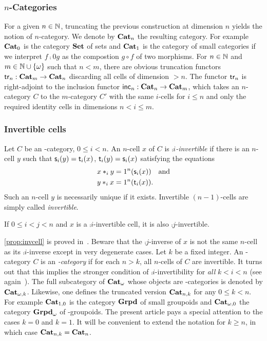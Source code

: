 \subsubsection{$n$-Categories}\label{ssubsec:ncat}
For a given $n\in\mathbb N$, truncating the previous construction at dimension $n$ yields the notion of $n$-category.  We denote by $\mathbf{Cat}_{n}$ the resulting category. For example $\mathbf{Cat}_{0}$ is the category $\mathbf{Set}$ of sets and $\mathbf{Cat}_{1}$ is the category of small categories if we interpret $f\comp 0 g$ as the compostion $g\circ f$ of two morphisms.
For $n\in\mathbb N$ and $m\in\mathbb N\cup \left\{\omega\right\}$ such that $n<m$, there are 
obvious truncation functors $\mathsf{tr}_{n}:\mathbf{Cat}_{m}\to \mathbf{Cat}_{n}$ discarding all cells of dimension $>n$. The functor $\mathsf{tr}_{n}$ is right-adjoint to the inclusion functor  $\mathsf{inc}_{n}:\mathbf{Cat}_{n}\to\mathbf{Cat}_{m}$, which takes an $n$-category $C$ to the $m$-category $C'$ with the same $i$-cells for $i\leq n$ and only the required identity cells in dimensions $n<i\leq m$.

\subsubsection{Invertible cells}\label{ssubsec:invert}
Let $C$ be an \oo-category, $0\leq i <n$. An $n$-cell $x$ of $C$ is {\em $\comp i$-invertible} if there is an $n$-cell $y$ such that $\mathsf{s}_{i}(y)=\mathsf{t}_{i}(x)$, $\mathsf{t}_{i}(y)=\mathsf{s}_{i}(x)$ satisfying the equations 
  \begin{align*}
    x\ast_{i} y & = 1^{n}(\mathsf{s}_{i}(x)) \quad \hbox{and}\\
    y\ast_{i} x & =  1^{n}(\mathsf{t}_{i}(x)).
  \end{align*}
  Such an $n$-cell $y$ is necessarily unique if it exists. Invertible $(n{-}1)$-cells are simply called {\em invertible}. 
  \begin{proposition}\label{prop:invcell}
    If $0\leq i< j<n$ and $x$ is a $\comp i$-invertible cell, it is also $\comp j$-invertible.
  \end{proposition}
  \begin{paragr}
    \cref{prop:invcell} is proved
    in~\cite[14.5]{abgmmm:polybk}. Beware that the $\comp j$-inverse
    of $x$ is not the same $n$-cell as its $\comp i$-inverse except in
    very degenerate cases. Let $k$ be a fixed integer. An \oo-category
    $C$ is an {\em {}-category} if for each $n>k$, all $n$-cells
    of $C$ are invertible. It turns out that this implies the stronger
    condition of $\comp i$-invertibility for {\em all} $k<i<n$ (see
    again~\cite[14.5]{abgmmm:polybk}).  The full subcategory of
    $\mathbf{Cat}_{\omega}$ whose objects are -categories is denoted by $\mathbf{Cat}_{\omega,k}$. Likewise, one defines the truncated version $\mathbf{Cat}_{n,k}$ for
    any $0\leq k<n$.  For example $\mathbf{Cat}_{1,0}$ is the category $\mathbf{Grpd}$
    of small groupoids and $\mathbf{Cat}_{\omega,0}$ the category $\mathbf{Grpd}_{\omega}$ of
    \oo-groupoids. The present article pays a special attention to the
    cases $k=0$ and $k=1$. It will be convenient to extend the
    notation for $k\geq n$, in which case $\mathbf{Cat}_{n,k}=\mathbf{Cat}_{n}$.
 \end{paragr} 


